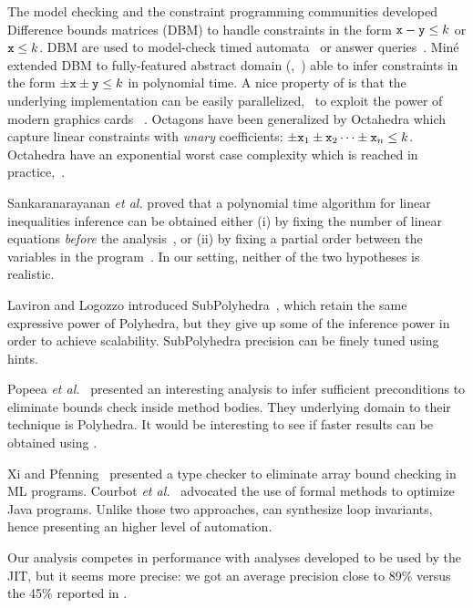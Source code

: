 \documentclass{elsart}
\begin{document}
The model checking and the constraint programming communities developed Difference bounds matrices (DBM) to handle constraints in the form $\mathtt{x} -\mathtt{y} \leq k$ or $\mathtt{x} \leq k$. 
DBM are used to model-check timed automata~\cite{AlurDill90,ModelChecking} or answer queries~\cite{Revesz07}.
Min\'e extended DBM to fully-featured abstract domain (\Octagons,~\cite{Mine01-1,Mine01-2}) able to infer constraints in the form $\pm \mathtt{x} \pm \mathtt{y} \leq k$ in polynomial time.
A nice property of \Octagons{} is that the underlying implementation can be easily parallelized, \eg\ to exploit the power of modern graphics cards ~\cite{BanterleG07}.
Octagons have been generalized by Octahedra which capture linear constraints with \emph{unary} coefficients: $\pm \mathtt{x}_1 \pm \mathtt{x}_2 \dots \pm \mathtt{x}_n \leq k$.  
Octahedra have an exponential worst case complexity which is reached in practice,~\cite{ClarisoCortadella07}.

Sankaranarayanan \emph{et al.} proved that a polynomial time algorithm for linear inequalities inference can be obtained  either (i) by fixing the number of linear equations \emph{before} the analysis~\cite{SankaranarayananEtAl05}, or (ii) by fixing a partial order between the variables in the program~\cite{SankaranarayananEtAl07}. 
In our setting, neither of the two hypotheses is realistic.

Laviron and Logozzo introduced SubPolyhedra~\cite{LavironLogozzo09}, which retain the same
expressive power of Polyhedra, but they give up some of the inference
power in order to achieve scalability.
SubPolyhedra precision can be finely tuned using hints.

Popeea \emph{et al.}~\cite{Popeea08} presented an interesting analysis to infer sufficient preconditions to eliminate bounds check inside method bodies. 
They underlying domain to their technique is Polyhedra. 
It would be interesting to see if faster results can be obtained using \Pentagons.


Xi and Pfenning~\cite{Xi98} presented a type checker to eliminate array bound checking in ML programs.
Courbot \emph{et al.}~\cite{courbot06} advocated the use of formal methods to optimize Java programs.
Unlike those two approaches, \Pentagons{} can synthesize loop invariants, hence presenting an higher level of automation.
 
Our analysis competes in performance with analyses developed to be used by the JIT, but it seems more precise: we got an average precision close to 89\% versus the 45\% reported in \cite{BodikEtAl00}.
\end{document}
